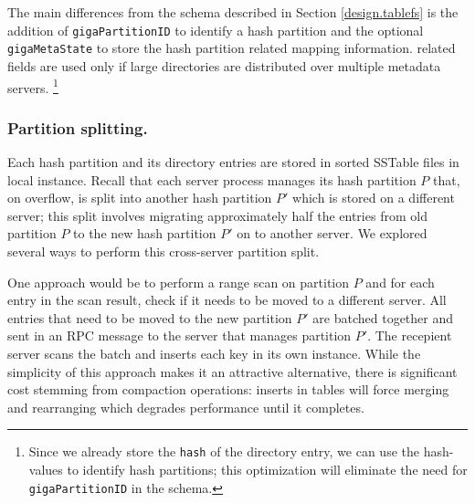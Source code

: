 The main differences from the \ldb{} schema described in Section
\ref{design.tablefs} is the addition of \texttt{gigaPartitionID} to identify a
\giga{} hash partition and the optional \texttt{gigaMetaState} to store the
hash partition related mapping information. \giga{} related fields are used
only if large directories are distributed over multiple metadata servers.
\footnote{
Since we already store the \texttt{hash} of the directory entry, we can use the
hash-values to identify hash partitions; this optimization will eliminate the
need for \texttt{gigaPartitionID} in the schema.} 

\subsubsection*{Partition splitting.}

Each \giga{} hash partition and its directory entries are stored in sorted
SSTable files in local \ldb{} instance. 
Recall that each \giga{} server process manages its hash partition $P$ that, on 
overflow, is split into another hash partition $P'$ which is stored on a 
different server; this split involves migrating approximately half the entries 
from old partition $P$ to the new hash partition $P'$ on to another server. 
We explored several ways to perform this cross-server partition split.

One approach would be to perform a range scan on partition $P$ and for each
entry in the scan result, check if it needs to be moved to a different server.
All entries that need to be moved to the new partition $P'$ are batched
together and sent in an RPC message to the server that manages partition $P'$.
The recepient server scans the batch and inserts each key in its own \ldb{}
instance. While the simplicity of this approach makes it an attractive
alternative, there is significant cost stemming from \ldb{} compaction
operations: inserts in \ldb{} tables will force merging and rearranging which
degrades performance until it completes.


